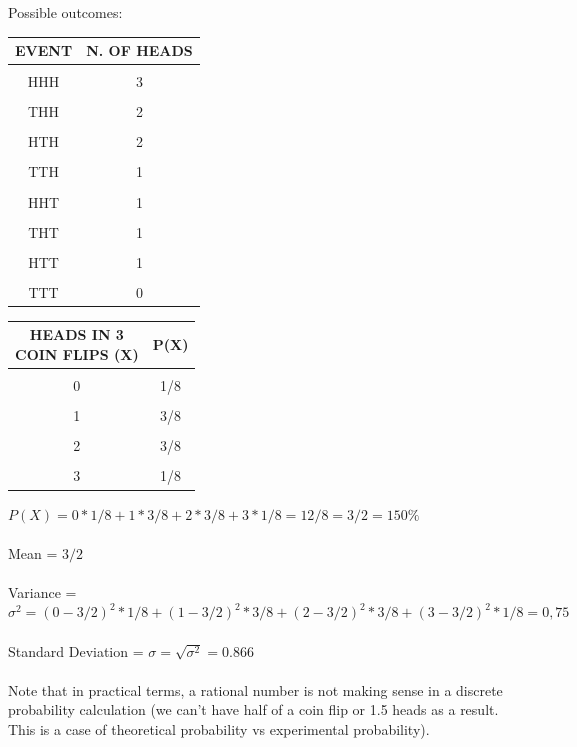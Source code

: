 \documentclass{article}
\begin{document}
Possible outcomes: \\ 
\begin{center}
\begin{tabular}{|c|c|}
\hline
EVENT & N. OF HEADS \\ \hline
&\\[-1em]
HHH & 3 \\ \hline
&\\[-1em]
THH & 2 \\ \hline
&\\[-1em]
HTH & 2 \\ \hline
&\\[-1em]
TTH & 1 \\ \hline
&\\[-1em]
HHT & 1 \\ \hline
&\\[-1em]
THT & 1 \\ \hline
&\\[-1em]
HTT & 1 \\ \hline
&\\[-1em]
TTT & 0 \\
\hline
\end{tabular}
\end{center}

\begin{center}
\begin{tabular}{|c|c|}
\hline
\makecell {HEADS IN 3 \\ COIN FLIPS (X)} & P(X)\\ \hline
&\\[-1em]
0 & 1/8 \\ \hline
&\\[-1em]
1 & 3/8 \\ \hline
&\\[-1em]
2 & 3/8 \\ \hline
&\\[-1em]
3 & 1/8 \\ 
\hline
\end{tabular}
\end{center}

$P(X) = 0 * 1/8 + 1 * 3/8 + 2 * 3/8  + 3 * 1/8 = 12 / 8  = 3 / 2 = 150\%  $ \\ 
\mbox{}\\
Mean = $3 / 2$ \\ 
\mbox{}\\
Variance = $\sigma^2 = (0 - 3/2)^2 * 1/8 + (1 - 3/2)^2 * 3/8 + (2 - 3/2)^2 * 3/8 + (3 - 3/2)^2 * 1/8 =  0,75$ \\ 
\mbox{}\\
Standard Deviation = $\sigma = \sqrt{\sigma^2} = 0.866$ \\ 
\mbox{}\\
Note that in practical terms, a rational number is not making sense in a discrete probability calculation (we can’t have half of a coin flip or 1.5 heads as a result. This is a case of theoretical probability vs experimental probability).   
\end{document}
